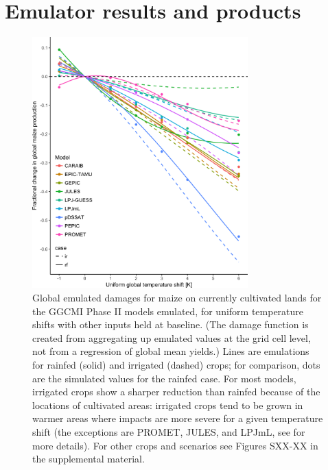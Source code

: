 \documentclass[gmd, manuscript]{copernicus} %
\begin{document}
\section{Emulator results and products}
\label{S:5}
\begin{figure}[ht]
    \centering
    \includegraphics[width=8.3cm]{figures/global_em_maize.png}
    \caption{Global emulated damages for maize on currently cultivated lands for the GGCMI Phase II models emulated, for uniform temperature shifts with other inputs held at baseline. 
    (The damage function is created from aggregating up emulated values at the grid cell level, not from a regression of global mean yields.) 
    Lines are emulations for rainfed (solid) and irrigated (dashed) crops; for comparison, dots are the simulated values for the rainfed case.  
    For most models, irrigated crops show a sharper reduction than rainfed because of the locations of cultivated areas: irrigated crops tend to be grown in warmer areas where impacts are more severe for a given temperature shift (the exceptions are PROMET, JULES, and LPJmL, see \citet{Franke2019a} for more details). 
    For other crops and scenarios see Figures SXX-XX in the supplemental material.}
    \label{fig:globe_em}
\end{figure}
\end{document}

